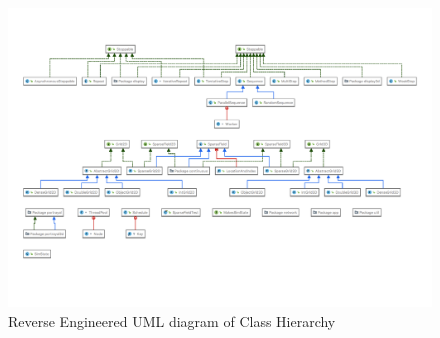 \documentclass[11pt]{article}
\begin{document}
\begin{figure}[htp]
\centering
\includegraphics[width=\textwidth]{Appendix/UML}
\caption{Reverse Engineered UML diagram of Class Hierarchy}
\label{fig:uml}
\end{figure}
\end{document}
